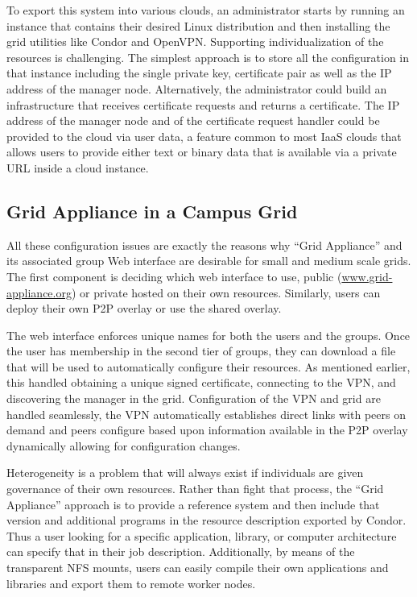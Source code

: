 To export this system into various clouds, an administrator starts by running
an instance that contains their desired Linux distribution and then installing
the grid utilities like Condor and OpenVPN.  Supporting individualization of
the resources is challenging.  The simplest approach is to store all the
configuration in that instance including the single private key, certificate
pair as well as the IP address of the manager node.  Alternatively, the
administrator could build an infrastructure that receives certificate requests
and returns a certificate.  The IP address of the manager node and of the
certificate request handler could be provided to the cloud via user data, a
feature common to most IaaS clouds that allows users to provide either text or
binary data that is available via a private URL inside a cloud instance.

\subsection{Grid Appliance in a Campus Grid}

All these configuration issues are exactly the reasons why ``Grid Appliance''
and its associated group Web interface are desirable for small and medium scale
grids.  The first component is deciding which web interface to use, public
(\url{www.grid-appliance.org}) or private hosted on their own resources.
Similarly, users can deploy their own P2P overlay or use the shared overlay.

The web interface enforces unique names for both the users and the groups.
Once the user has membership in the second tier of groups, they can download a
file that will be used to automatically configure their resources.  As
mentioned earlier, this handled obtaining a unique signed certificate,
connecting to the VPN, and discovering the manager in the grid.  Configuration
of the VPN and grid are handled seamlessly, the VPN automatically establishes
direct links with peers on demand and peers configure based upon information
available in the P2P overlay dynamically allowing for configuration changes.

Heterogeneity is a problem that will always exist if individuals are given
governance of their own resources.  Rather than fight that process, the ``Grid
Appliance'' approach is to provide a reference system and then include that
version and additional programs in the resource description exported by Condor.
Thus a user looking for a specific application, library, or computer
architecture can specify that in their job description.  Additionally, by means
of the transparent NFS mounts, users can easily compile their own applications
and libraries and export them to remote worker nodes.

